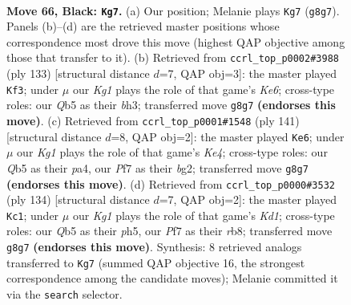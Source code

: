 \documentclass[11pt]{article}
\begin{document}
\clearpage

\begin{figure}[p]\centering
\begin{subfigure}{0.46\textwidth}\centering
\resizebox{\linewidth}{!}{%
\newchessgame
\chessboard[
  setfen={6kb/5p2/3P4/1q6/7K/8/8/8 b - - 2 66},
  showmover=false,
  pgfstyle=straightmove, color=movearrow, markmove={g8-g7}
]}
\caption{}
\end{subfigure}\hfill
\begin{subfigure}{0.46\textwidth}\centering
\resizebox{\linewidth}{!}{%
\newchessgame
\chessboard[
  setfen={8/8/8/8/8/2K1k2B/4bp1P/8 b - - 15 67},
  showmover=false,
  pgfstyle=straightmove, color=movearrow, markmove={e3-f3}
]}
\caption{}
\end{subfigure}
\\[4pt]
\begin{subfigure}{0.46\textwidth}\centering
\resizebox{\linewidth}{!}{%
\newchessgame
\chessboard[
  setfen={8/8/8/p3kb2/P7/8/6B1/4K3 b - - 2 71},
  showmover=false,
  pgfstyle=straightmove, color=movearrow, markmove={e5-e6}
]}
\caption{}
\end{subfigure}\hfill
\begin{subfigure}{0.46\textwidth}\centering
\resizebox{\linewidth}{!}{%
\newchessgame
\chessboard[
  setfen={1r6/7k/8/7p/7P/8/3B4/3K4 w - - 34 68},
  showmover=false,
  pgfstyle=straightmove, color=movearrow, markmove={d1-c1}
]}
\caption{}
\end{subfigure}
\caption{\textbf{Move 66, Black: \texttt{Kg7}.} (a) Our position; Melanie plays \texttt{Kg7} (\texttt{g8g7}). Panels (b)--(d) are the retrieved master positions whose correspondence most drove this move (highest QAP objective among those that transfer to it). (b) Retrieved from \texttt{ccrl\_top\_p0002\#3988} (ply 133) [structural distance $d$=7, QAP obj=3]: the master played \texttt{Kf3}; under $\mu$ our \emph{Kg1} plays the role of that game's \emph{Ke6}; cross-type roles: our \emph{Q}b5 as their \emph{b}h3; transferred move \texttt{g8g7} \textbf{(endorses this move)}. (c) Retrieved from \texttt{ccrl\_top\_p0001\#1548} (ply 141) [structural distance $d$=8, QAP obj=2]: the master played \texttt{Ke6}; under $\mu$ our \emph{Kg1} plays the role of that game's \emph{Ke4}; cross-type roles: our \emph{Q}b5 as their \emph{p}a4, our \emph{P}f7 as their \emph{b}g2; transferred move \texttt{g8g7} \textbf{(endorses this move)}. (d) Retrieved from \texttt{ccrl\_top\_p0000\#3532} (ply 134) [structural distance $d$=7, QAP obj=2]: the master played \texttt{Kc1}; under $\mu$ our \emph{Kg1} plays the role of that game's \emph{Kd1}; cross-type roles: our \emph{Q}b5 as their \emph{p}h5, our \emph{P}f7 as their \emph{r}b8; transferred move \texttt{g8g7} \textbf{(endorses this move)}. Synthesis: 8 retrieved analogs transferred to \texttt{Kg7} (summed QAP objective 16, the strongest correspondence among the candidate moves); Melanie committed it via the \texttt{search} selector.}
\label{fig:thought-m131}
\end{figure}
\end{document}
